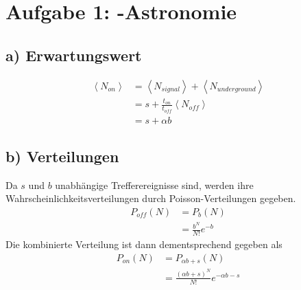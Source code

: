\section*{Aufgabe 1: \gamma-Astronomie}
\label{sec:Aufgabe1}
\subsection*{a) Erwartungswert}
\label{sub:Erwartungswert}
\begin{align}
    \left<N_{on}\right> &=\left<N_{signal}\right>+\left<N_{underground}\right>\nonumber\\
                        &=s + \frac{t_{on}}{t_{off}} \left<N_{off}\right>\nonumber\\
                        &=s+\alpha b
\end{align}

\subsection*{b) Verteilungen}
\label{sub:Verteilungen}
Da $s$ und $b$ unabhängige Trefferereignisse sind, werden ihre Wahrscheinlichkeitsverteilungen durch Poisson-Verteilungen gegeben.
\begin{align}
    P_{off}(N)&=P_{b}(N)\nonumber\\
              &=\frac{b^N}{N!}e^{-b}
\end{align}
Die kombinierte Verteilung ist dann dementsprechend gegeben als
\begin{align}
    P_{on}(N)&=P_{\alpha b+s}(N)\nonumber\\
                       &=\frac{(\alpha b+s)^N}{N!}e^{-\alpha b-s}
\end{align}


